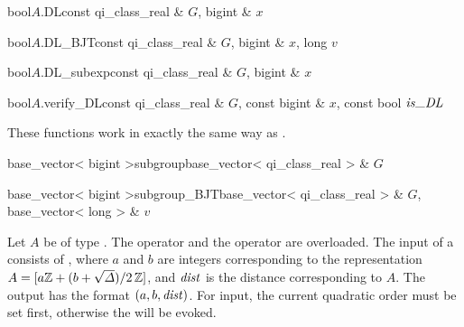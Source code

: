 \begin{cfcode}{bool}{$A$.DL}{const qi_class_real & $G$, bigint & $x$}
\end{cfcode}

\begin{cfcode}{bool}{$A$.DL_BJT}{const qi_class_real & $G$, bigint & $x$, long $v$}
\end{cfcode}


\begin{cfcode}{bool}{$A$.DL_subexp}{const qi_class_real & $G$, bigint & $x$}
\end{cfcode}

\begin{cfcode}{bool}{$A$.verify_DL}{const qi_class_real & $G$, const bigint & $x$,
    const bool $\mathit{is\uscore DL}$}
\end{cfcode}




These functions work in exactly the same way as .

\begin{fcode}{base_vector< bigint >}{subgroup}{base_vector< qi_class_real > & $G$}
\end{fcode}

\begin{fcode}{base_vector< bigint >}{subgroup_BJT}{base_vector< qi_class_real > & $G$, base_vector< long > & $v$}
\end{fcode}




\IO

Let $A$ be of type .  The  operator \code{>>} and the
 operator \code{<<} are overloaded.  The input of a  consists
of , where $a$ and $b$ are integers corresponding to the representation $A =
[a \mathbb{Z} + (b + \sqrt{\varDelta})/2 \, \mathbb{Z} ]$, and $\mathit{dist}$ is the distance corresponding to $A$.  The
output has the format $(a,b,\mathit{dist})$.  For input, the current quadratic order must be set first,
otherwise the \LEH will be evoked.



